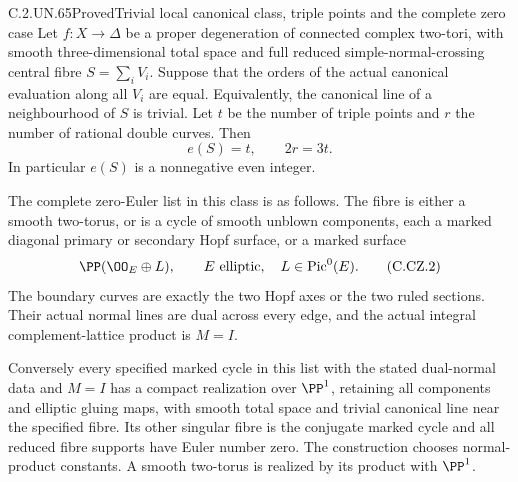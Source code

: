 \begin{statement}{C.2.UN.65}{Proved}{Trivial local canonical class, triple points and the complete zero case}
Let $f:X\to\Delta$ be a proper degeneration of connected complex
two-tori, with smooth three-dimensional total space and full
reduced simple-normal-crossing central fibre
$S=\sum_iV_i$. Suppose that the orders of the actual canonical
evaluation along all $V_i$ are equal. Equivalently, the canonical
line of a neighbourhood of $S$ is trivial. Let $t$ be the number
of triple points and $r$ the number of rational double curves.
Then
\[
                         e(S)=t,\qquad 2r=3t.
\tag{C.CZ.1}
\]
In particular $e(S)$ is a nonnegative even integer.

The complete zero-Euler list in this class is as follows.
The fibre is either a smooth two-torus, or is a cycle of smooth
unblown components, each a marked diagonal primary or secondary
Hopf surface, or a marked surface
\[
                   \PP(\OO_E\oplus L),
          \qquad E\text{ elliptic},\quad L\in\operatorname{Pic}^0(E).
\tag{C.CZ.2}
\]
The boundary curves are exactly the two Hopf axes or the two
ruled sections. Their actual normal lines are dual across
every edge, and the actual integral complement-lattice product
is $M=I$.

Conversely every specified marked cycle in this list with
the stated dual-normal data and $M=I$ has a compact realization
over $\PP^1$, retaining all components and elliptic gluing
maps, with smooth total space and trivial canonical line
near the specified fibre. Its other singular fibre is the
conjugate marked cycle and all reduced fibre supports have
Euler number zero. The construction chooses normal-product
constants. A smooth two-torus is realized by its product
with $\PP^1$.
\end{statement}

